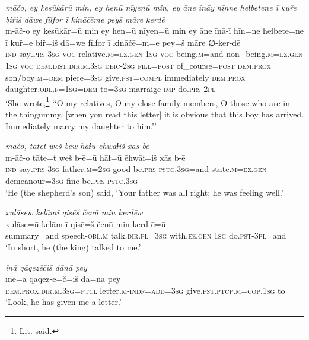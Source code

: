 \ea \label{KŠ.80}
\textit{māčo, ey kesūkārū min, ey henū nīyenū min, ey āne īnāy hīnne heɫbetene ī kuře biřiš dāwe fīlfor ī kināčēme peyš māre kerdē} \\ 
\gll m-āč-o ey kesūkār=ū min ey hen=ū nīyen=ū min ey āne īnā-ī hīn=ne heɫbete=ne ī kuř=e biř=iš dā=we fīlfor ī kināčē=m=e pey=š māre ∅-ker-dē \\ 
 \textsc{ind-}say\textsc{.prs}\textsc{-3sg} \textsc{voc} relative\textsc{.m}\textsc{\textsc{=ez.gen}} \textsc{1sg} \textsc{voc} being\textsc{.m}=and non\_being\textsc{.m}\textsc{\textsc{=ez.gen}} \textsc{1sg} \textsc{voc} \textsc{dem.dist}\textsc{.dir}\textsc{.m}\textsc{.3sg} \textsc{deic}-\textsc{2sg} \textsc{fill}\textsc{=\textsc{post}} of\_course\textsc{=\textsc{post}} \textsc{dem.prox} son/boy\textsc{.m}\textsc{=dem} piece\textsc{=3sg} give\textsc{.pst}\textsc{=compl} immediately \textsc{dem.prox} daughter\textsc{.obl}\textsc{.f}\textsc{=\textsc{1sg}}\textsc{=dem} to\textsc{=3sg} marraige \textsc{imp-}do\textsc{.prs}-\textsc{2pl} \\ 
\glt `She wrote,\footnote{Lit. said.} ‘‘O my relatives, O my close family members, O those who are in the thingummy, [when you read this letter] it is obvious that this boy has arrived. Immediately marry my daughter to him.’'
\z 
 
\ea \label{KŠ.82}
\textit{māčo, tātet weš bēw hāɫū ēhwāɫiš xās bē} \\ 
\gll m-āč-o tāte=t weš b-ē=ū hāɫ=ū ēhwāɫ=iš xās b-ē \\ 
 \textsc{ind-}say\textsc{.prs}\textsc{-3sg} father\textsc{.m}\textsc{=\textsc{2sg}} good be\textsc{.prs}\textsc{-pstc}\textsc{.3sg}=and state\textsc{.m}\textsc{\textsc{=ez.gen}} demeanour\textsc{=3sg} fine be\textsc{.prs}\textsc{-pstc}\textsc{.3sg} \\ 
\glt `He (the shepherd’s son) said, ‘Your father was all right; he was feeling well.'
\z 
 
\ea \label{KŠ.83}
\textit{xulāsew kelāmī qisēš čenū min kerdēw} \\ 
\gll xulāse=ū kelām-ī qisē=š čenū min kerd-ē=ū \\ 
 summary=and speech\textsc{-obl}\textsc{.m} talk\textsc{.dir}\textsc{.pl}\textsc{=3sg} with\textsc{\textsc{.ez}.gen} \textsc{1sg} do\textsc{.pst}\textsc{-3pl}=and \\ 
\glt `In short, he (the king) talked to me.'
\z 
 
\ea \label{KŠ.84}
\textit{īnā qāqezēčiš dānā pey} \\ 
\gll īne=ā qāqez-ē=č=iš dā=nā pey \\ 
 \textsc{dem.prox}\textsc{.dir}\textsc{.m}\textsc{.3sg}=\textsc{ptcl} letter\textsc{.m}\textsc{-indf}\textsc{=add}\textsc{=3sg} give\textsc{.pst}\textsc{.ptcp}\textsc{.m}\textsc{=cop}\textsc{.\textsc{1sg}} to \\ 
\glt `Look, he has given me a letter.'
\z 
 
